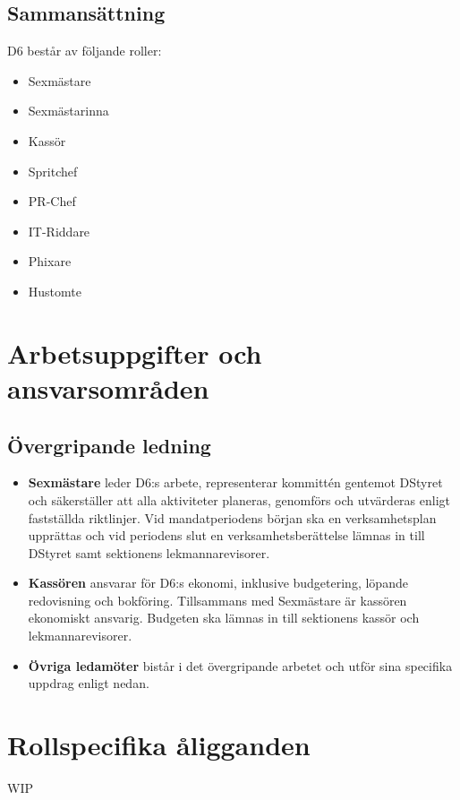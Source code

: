 \documentclass[a4paper]{dtekinstruktion}
\begin{document}
\subsection{Sammansättning}
D6 består av följande roller:
\begin{itemize}
  \item Sexmästare
  \item Sexmästarinna
  \item Kassör
  \item Spritchef
  \item PR-Chef
  \item IT-Riddare
  \item Phixare
  \item Hustomte
\end{itemize}

\section{Arbetsuppgifter och ansvarsområden}
\subsection{Övergripande ledning}
\begin{itemize}
  \item \textbf{Sexmästare} leder D6:s arbete, representerar kommittén gentemot DStyret och säkerställer att alla aktiviteter planeras, genomförs och utvärderas enligt fastställda riktlinjer. Vid mandatperiodens början ska en verksamhetsplan upprättas och vid periodens slut en verksamhetsberättelse lämnas in till DStyret samt sektionens lekmannarevisorer.
  \item \textbf{Kassören} ansvarar för D6:s ekonomi, inklusive budgetering, löpande redovisning och bokföring. Tillsammans med Sexmästare är kassören ekonomiskt ansvarig. Budgeten ska lämnas in till sektionens kassör och lekmannarevisorer.
  \item \textbf{Övriga ledamöter} bistår i det övergripande arbetet och utför sina specifika uppdrag enligt nedan.
\end{itemize}

\section{Rollspecifika åligganden}
WIP
\end{document}
